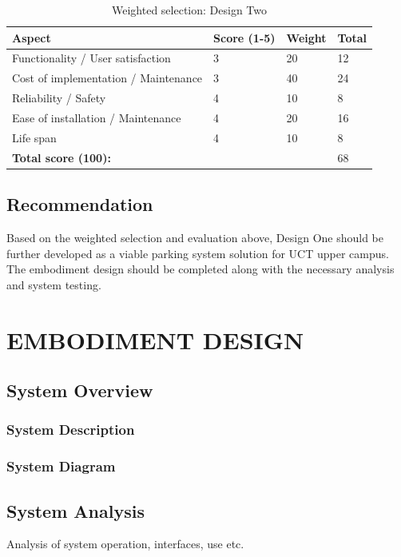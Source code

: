\begin{table}[H]
\centering
\caption{Weighted selection: Design Two\cite{handout}}
\label{my-label}
\begin{tabular}{l|l|l|l|}
\textbf{Aspect}                      & \textbf{Score (1-5)} & \textbf{Weight} & \textbf{Total} \\ \hline
Functionality / User satisfaction    & 3                     & 20                & 12               \\
Cost of implementation / Maintenance & 3                     & 40                & 24               \\
Reliability / Safety                 & 4                     & 10                & 8                \\
Ease of installation / Maintenance   & 4                     & 20                & 16               \\
Life span                            & 4                     & 10                & 8                \\ \hline
\textbf{Total score (100):}          &                       &                   & 68              
\end{tabular}
\end{table}

\subsection{Recommendation}
Based on the weighted selection and evaluation above, Design One should be further developed as a viable parking system solution for UCT upper campus. The embodiment design should be completed along with the necessary analysis and system testing.

\newpage
\section{EMBODIMENT DESIGN}
\subsection{System Overview}
\subsubsection{System Description}
\subsubsection{System Diagram}
\subsection{System Analysis}
Analysis of system operation, interfaces, use etc.
